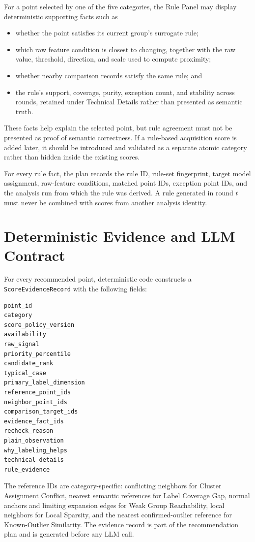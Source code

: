 \documentclass[11pt]{article}
\begin{document}
For a point selected by one of the five categories, the Rule Panel may display
deterministic supporting facts such as
\begin{itemize}[leftmargin=*]
    \item whether the point satisfies its current group's surrogate rule;
    \item which raw feature condition is closest to changing, together with the
    raw value, threshold, direction, and scale used to compute proximity;
    \item whether nearby comparison records satisfy the same rule; and
    \item the rule's support, coverage, purity, exception count, and stability
    across rounds, retained under Technical Details rather than presented as
    semantic truth.
\end{itemize}
These facts help explain the selected point, but rule agreement must not be
presented as proof of semantic correctness. If a rule-based acquisition score
is added later, it should be introduced and validated as a separate atomic
category rather than hidden inside the existing scores.

For every rule fact, the plan records the rule ID, rule-set fingerprint, target
model assignment, raw-feature conditions, matched point IDs, exception point
IDs, and the analysis run from which the rule was derived. A rule generated in
round $t$ must never be combined with scores from another analysis identity.

\section{Deterministic Evidence and LLM Contract}

For every recommended point, deterministic code constructs a
\texttt{ScoreEvidenceRecord} with the following fields:
\begin{verbatim}
point_id
category
score_policy_version
availability
raw_signal
priority_percentile
candidate_rank
typical_case
primary_label_dimension
reference_point_ids
neighbor_point_ids
comparison_target_ids
evidence_fact_ids
recheck_reason
plain_observation
why_labeling_helps
technical_details
rule_evidence
\end{verbatim}

The reference IDs are category-specific: conflicting neighbors for Cluster
Assignment Conflict, nearest semantic references for Label Coverage Gap,
normal anchors and limiting expansion edges for Weak Group Reachability, local
neighbors for Local Sparsity, and the nearest confirmed-outlier reference for
Known-Outlier Similarity. The evidence record is part of the recommendation
plan and is generated before any LLM call.
\end{document}
